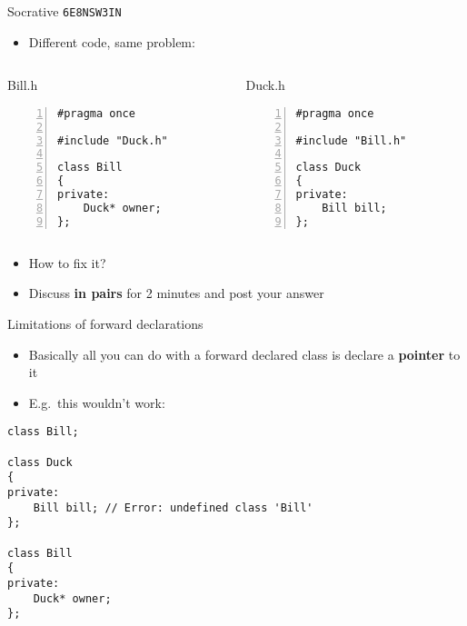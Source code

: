 \begin{frame}[fragile]{Socrative \texttt{6E8NSW3IN}}
    \begin{itemize}
        \item Different code, same problem:
    \end{itemize}
    
    \begin{columns}
        \begin{column}{0.4\textwidth}
            Bill.h
            \begin{lstlisting}[numbers=left, numberstyle=\tiny\texttt]
#pragma once

#include "Duck.h"

class Bill
{
private:
    Duck* owner;
};
            \end{lstlisting}
        \end{column}
        \begin{column}{0.4\textwidth}
            Duck.h
            \begin{lstlisting}[numbers=left, numberstyle=\tiny\texttt]
#pragma once

#include "Bill.h"

class Duck
{
private:
    Bill bill;
};
            \end{lstlisting}
        \end{column}
    \end{columns}
    \begin{itemize}
        \item How to fix it?
        \item Discuss \textbf{in pairs} for 2 minutes and post your answer
    \end{itemize}
\end{frame}

\begin{frame}[fragile]{Limitations of forward declarations}
    \begin{itemize}
        \item Basically all you can do with a forward declared class is declare a \textbf{pointer} to it \pause
        \item E.g.\ this wouldn't work:
    \end{itemize}
    \begin{lstlisting}
class Bill;

class Duck
{
private:
    Bill bill; // Error: undefined class 'Bill'
};

class Bill
{
private:
    Duck* owner;
};
    \end{lstlisting}
\end{frame}

